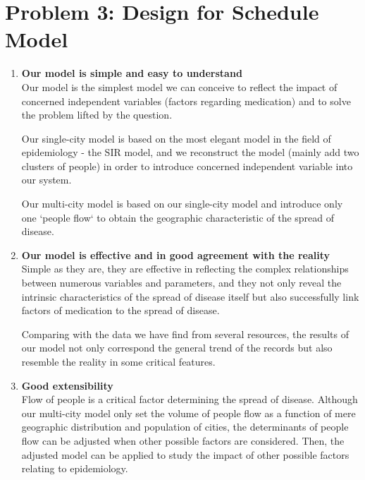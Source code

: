 \section{Problem 3: Design for Schedule Model}
\begin{enumerate}
\item \textbf{Our model is simple and easy to understand} \\
Our model is the simplest model we can conceive to reflect the impact of concerned independent variables (factors regarding medication) and to solve the problem lifted by the question. 

Our single-city model is based on the most elegant model in the field of epidemiology - the SIR model, and we reconstruct the model (mainly add two clusters of people) in order to introduce concerned independent variable into our system. 

Our multi-city model is based on our single-city model and introduce only one `people flow` to obtain the geographic characteristic of the spread of disease.

\item \textbf{Our model is effective and in good agreement with the reality} \\
Simple as they are, they are effective in reflecting the complex relationships between numerous variables and parameters, and they not only reveal the intrinsic characteristics of the spread of disease itself but also successfully link factors of medication to the spread of disease.

Comparing with the data we have find from several resources, the results of our model not only correspond the general trend of the records but also resemble the reality in some critical features.

\item \textbf{Good extensibility} \\
Flow of people is a critical factor determining the spread of disease. Although our multi-city model only set the volume of people flow as a function of mere geographic distribution and population of cities, the determinants of people flow can be adjusted when other possible factors are considered. Then, the adjusted model can be applied to study the impact of other possible factors relating to epidemiology.

\end{enumerate}



